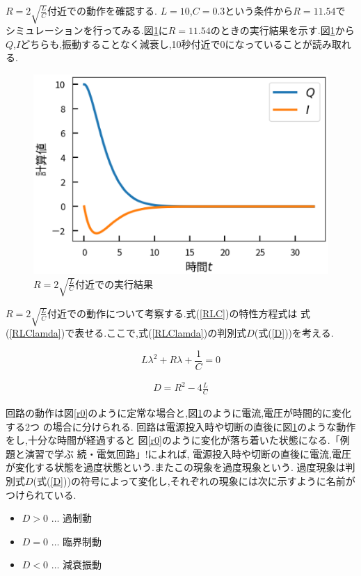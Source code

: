 \documentclass[a4j]{jarticle}
\begin{document}
        $R=2\sqrt{\frac{L}{C}}$付近での動作を確認する. $L=10$,$C=0.3$という条件から$R=11.54$で
        シミュレーションを行ってみる.図\ref{kado}に$R=11.54$のときの実行結果を示す.図\ref{kado}から
        $Q$,$I$どちらも,振動することなく減衰し,10秒付近で0になっていることが読み取れる.

        \begin{figure}[H]
          \centering
          \includegraphics[scale=0.6]{kado.eps}
          \caption{$R=2\sqrt{\frac{L}{C}}$付近での実行結果}
          \label{kado}
          \end{figure}

        $R=2\sqrt{\frac{L}{C}}$付近での動作について考察する.式(\ref{RLC})の特性方程式は
        式(\ref{RLClamda})で表せる.ここで,式(\ref{RLClamda})の判別式$D$(式(\ref{D}))を考える.

        \begin{equation}
          L \lambda^2 +R \lambda + \frac{1}{C}=0
          \label{RLClamda}
        \end{equation}

        \begin{eqnarray}
          D = R^2 -4\frac{L}{C} \label{D} 
        \end{eqnarray}

        回路の動作は図\ref{r0}のように定常な場合と,図\ref{kado}のように電流,電圧が時間的に変化する2つ
        の場合に分けられる. 回路は電源投入時や切断の直後に図\ref{kado}のような動作をし,十分な時間が経過すると
        図\ref{r0}のように変化が落ち着いた状態になる.「例題と演習で学ぶ 続・電気回路」!によれば,
        電源投入時や切断の直後に電流,電圧が変化する状態を過度状態という.またこの現象を過度現象という.
        過度現象は判別式$D$(式(\ref{D}))の符号によって変化し,それぞれの現象には次に示すように名前がつけられている.
        \begin{itemize}
          \item $D>0$ $\dots$ 過制動
          \item $D=0$ $\dots$ 臨界制動
          \item $D<0$ $\dots$ 減衰振動
        \end{itemize}
\end{document}
